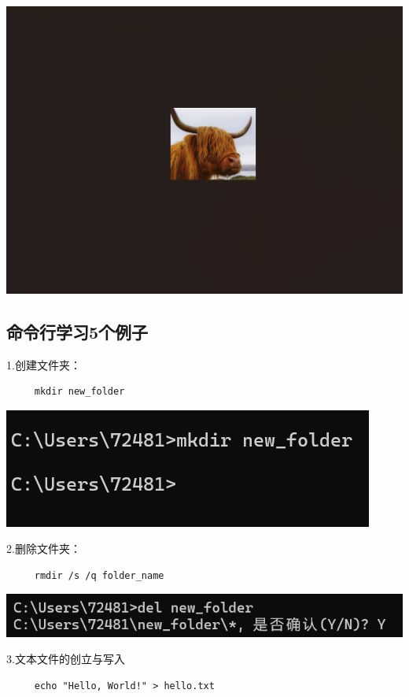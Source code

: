 \documentclass{article}
\begin{document}
\noindent
\begin{minipage}{\linewidth}
 \centering
  \includegraphics[width=0.5\linewidth]{缩略图.png}
  \label{fig:example}
\end{minipage}

\subsection{命令行学习5个例子}
1.创建文件夹：
\begin{verbatim}
     mkdir new_folder
\end{verbatim}
\noindent
\begin{minipage}{\linewidth}
 \centering
  \includegraphics[width=0.5\linewidth]{命令行1.png}
  \label{fig:example}
\end{minipage}


2.删除文件夹：
\begin{verbatim}
     rmdir /s /q folder_name
\end{verbatim}


\noindent
\begin{minipage}{\linewidth}
 \centering
  \includegraphics[width=0.5\linewidth]{命令行2.png}
  \label{fig:example}
\end{minipage}


3.文本文件的创立与写入
\begin{verbatim}
     echo "Hello, World!" > hello.txt
\end{verbatim}
\end{document}
